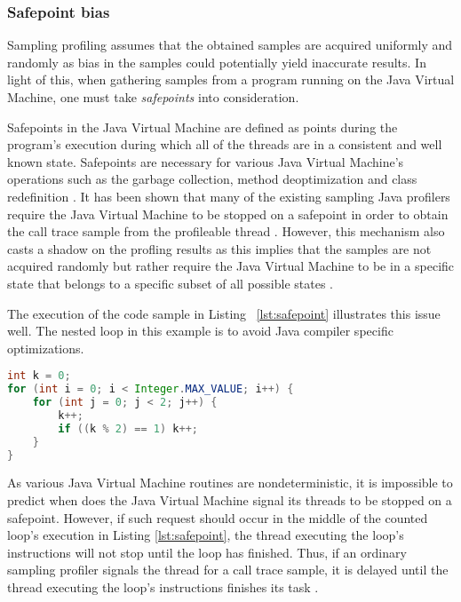 \documentclass[..thesis.tex]{subfiles}
\begin{document}
\subsubsection{Safepoint bias}
Sampling profiling assumes that the obtained samples are acquired uniformly and randomly as bias in the samples could potentially yield inaccurate results. In light of this, when gathering samples from a program running on the Java Virtual Machine, one must take \textit{safepoints} into consideration.

Safepoints in the Java Virtual Machine are defined as points during the program's execution during which all of the threads are in a consistent and well known state. Safepoints are necessary for various Java Virtual Machine's operations such as the garbage collection, method deoptimization and class redefinition \cite{hotspot_glossary}. It has been shown that many of the existing sampling Java profilers require the Java Virtual Machine to be stopped on a safepoint in order to obtain the call trace sample from the profileable thread \cite{wakart_psychosomatic_2016}. However, this mechanism also casts a shadow on the profling results as this implies that the samples are not acquired randomly but rather require the Java Virtual Machine to be in a specific state that belongs to a specific subset of all possible states \cite{mytkowicz_evaluating_2010}. 

The execution of the code sample in Listing ~\ref{lst:safepoint} illustrates this issue well. The nested loop in this example is to avoid Java compiler specific optimizations.
\begin{lstlisting}[language=java,style=def,label={lst:safepoint}, caption={Counted loops do not contain safepoints}]
int k = 0;
for (int i = 0; i < Integer.MAX_VALUE; i++) {
	for (int j = 0; j < 2; j++) {
    	k++;
    	if ((k % 2) == 1) k++;
	}
}
\end{lstlisting}
As various Java Virtual Machine routines are nondeterministic, it is impossible to predict when does the Java Virtual Machine signal its threads to be stopped on a safepoint. However, if such request should occur in the middle of the counted loop's execution in Listing \ref{lst:safepoint}, the thread executing the loop's instructions will not stop until the loop has finished. Thus, if an ordinary sampling profiler signals the thread for a call trace sample, it is delayed until the thread executing the loop's instructions finishes its task \cite{wakart_psychosomatic_2015}. 
\end{document}
